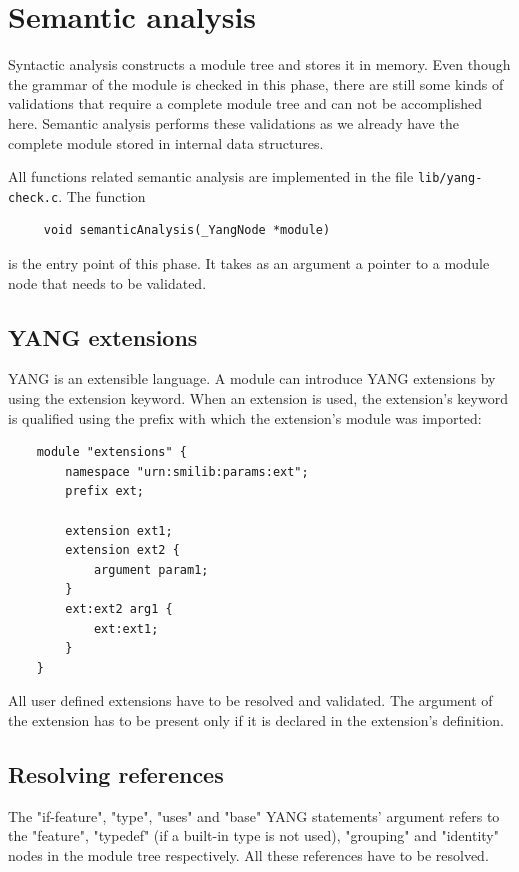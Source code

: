 \documentclass[conference]{IEEEtran}
\begin{document}
\section{Semantic analysis}
Syntactic analysis constructs a module tree and stores it in memory. 
Even though the grammar of the module is checked in this phase,
there are still some kinds of validations that require a complete module tree
and can not be accomplished here.
Semantic analysis performs these validations as we already have the complete module stored in internal data structures.

All functions related semantic analysis are implemented in the file \texttt{lib/yang-check.c}. The function
\small
\begin{verbatim}
     void semanticAnalysis(_YangNode *module)
\end{verbatim}
\normalsize
is the entry point of this phase. It takes as an argument a pointer to a module node that needs to be validated. 

\subsection{YANG extensions}
YANG is an extensible language. A module can introduce YANG extensions by using the extension keyword.
When an extension is used, the extension's keyword is qualified using the prefix with which the extension's module was imported:
\small
\begin{verbatim}
    module "extensions" {
        namespace "urn:smilib:params:ext";
        prefix ext;
        
        extension ext1;
        extension ext2 {
            argument param1;
        }
        ext:ext2 arg1 {
            ext:ext1;
        }
    }
\end{verbatim}
\normalsize

All user defined extensions have to be resolved and validated. The argument of the extension has to be present only if it is declared in the extension's definition. 

\subsection{Resolving references}
The "if-feature", "type", "uses" and "base" YANG statements' argument refers to the "feature", "typedef" (if a built-in type is not used), "grouping" and "identity"
nodes in the module tree respectively. All these references have to be resolved.   
\end{document}
